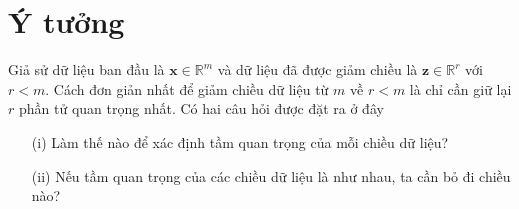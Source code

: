 \documentclass[12pt,a4paper,oneside]{report}
\numberwithin{equation}{section}
\begin{document}
\section{Ý tưởng}
Giả sử dữ liệu ban đầu là $\mathbf{x} \in \mathbb{R}^{m}$ và dữ liệu đã được giảm chiều là $\mathbf{z} \in \mathbb{R}^{r}$ với $r<m$. Cách đơn giản nhất để giảm chiều dữ liệu từ $m$ về $r<m$ là chỉ cần giữ lại $r$ phần tử quan trọng nhất. Có hai câu hỏi được đặt ra ở đây
\begin{itemize}

\item[(i)] Làm thế nào để xác định tầm quan trọng của mỗi chiều dữ liệu?
\item[(ii)] Nếu tầm quan trọng của các chiều dữ liệu là như nhau, ta cần bỏ đi chiều nào?
	
\end{itemize}
\end{document}
